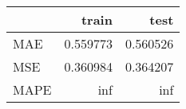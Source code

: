 \begin{tabular}{lrr}
\toprule
{} &     train &      test \\
\midrule
MAE  &  0.559773 &  0.560526 \\
MSE  &  0.360984 &  0.364207 \\
MAPE &       inf &       inf \\
\bottomrule
\end{tabular}
